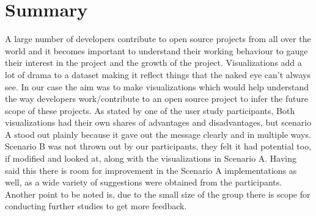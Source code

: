 \documentclass[double,12pt]{beavtex}
\begin{document}
\chapter{Summary}
A large number of developers contribute to open source projects from all over the world and it becomes important to understand their working behaviour to gauge their interest in the project and the growth of the project. Visualizations add a lot of drama to a dataset making it reflect things that the naked eye can't always see. In our case the aim was to make visualizations which would help understand the way developers work/contribute to an open source project to infer the future scope of these projects. As stated by one of the user study participants,  Both visualizations had their own shares of advantages and disadvantages, but scenario A stood out plainly because it gave out the message clearly and in multiple ways. Scenario B was not thrown out by our participants, they felt it had potential too, if modified and looked at, along with the visualizations in Scenario A. Having said this there is room for improvement in the Scenario A implementations as well, as a wide variety of suggestions were obtained from the participants. Another point to be noted is, due to the small size of the group there is scope for conducting further studies to get more feedback.



\end{document}
